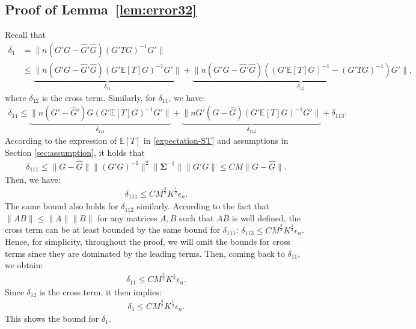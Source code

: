\documentclass[preprint,11pt]{article}
\newcommand{\mbb}{\mathbb}
\numberwithin{equation}{section}
\begin{document}
\subsection{Proof of Lemma~\ref{lem:error32}}
Recall that
\begin{align*}
    \delta_1&=\|n(G'G-\widehat{G}'\widehat{G})(G'TG)^{-1}G'\|\\
    &\le \underbrace{\|n(G'G-\widehat{G}'\widehat{G})(G'\mbb{E}[T]G)^{-1}G'\|}_{\delta_{11}}+\underbrace{\|n(G'G-\widehat{G}'\widehat{G})((G'\mbb{E}[T]G)^{-1}-(G'TG)^{-1})G'\|}_{\delta_{12}},
\end{align*}
where $\delta_{12}$ is the cross term. Similarly, for $\delta_{11}$, we have:
\begin{align*}
    \delta_{11}\le \underbrace{\|n(G'-\widehat{G}')G(G'\mbb{E}[T]G)^{-1}G'\|}_{\delta_{111}}+\underbrace{\|nG'(G-\widehat{G})(G'\mbb{E}[T]G)^{-1}G'\|}_{\delta_{112}}+\delta_{113}.
\end{align*}
According to the expression of $\mathbb{E}[T]$ in \eqref{expectation-ST} and assumptions in Section \ref{sec:assumption}, it holds that
\begin{align*}
    \delta_{111}\le \|G-\widehat{G}\|\|(G'G)^{-1}\|^2\|\bm{\Sigma}^{-1}\|\|G'G\|\le CM\|G-\widehat{G}\|.
\end{align*}
Then, we have:
\begin{align*}
    \delta_{111}\le CM^{\frac{3}{2}}K^{\frac{1}{2}}\epsilon_n.
\end{align*}
The same bound also holds for $\delta_{112}$ similarly. According to the fact that $\|AB\|\le \|A\|\|B\|$ for any matrices $A,B$ such that $AB$ is well defined, the cross term can be at least bounded by the same bound for $\delta_{111}$: $\delta_{113}\le CM^{\frac{3}{2}}K^{\frac{1}{2}}\epsilon_n$. Hence, for simplicity, throughout the proof, we will omit the bounds for cross terms since they are dominated by the leading terms. Then, coming back to $\delta_{11}$, we obtain:
\begin{align*}
    \delta_{11}\le CM^{\frac{3}{2}}K^{\frac{1}{2}}\epsilon_n.
\end{align*}
Since $\delta_{12}$ is the cross term, it then implies:
\begin{align*}
    \delta_{1}\le CM^{\frac{3}{2}}K^{\frac{1}{2}}\epsilon_n.
\end{align*}
This shows the bound for $\delta_1$.
\end{document}
